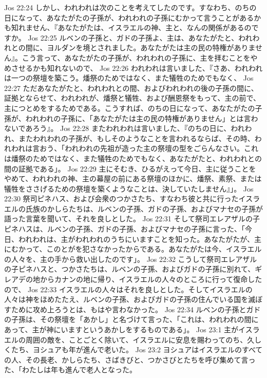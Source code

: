 Jos 22:24  しかし、われわれは次のことを考えてしたのです。すなわち、のちの日になって、あなたがたの子孫が、われわれの子孫にむかって言うことがあるかも知れません、『あなたがたは、イスラエルの神、主と、なんの関係があるのですか。
Jos 22:25  ルベンの子孫と、ガドの子孫よ、主は、あなたがたと、われわれとの間に、ヨルダンを境とされました。あなたがたは主の民の特権がありません』。こう言って、あなたがたの子孫が、われわれの子孫に、主を拝むことをやめさせるかも知れないので、
Jos 22:26  われわれは言いました、『さあ、われわれは一つの祭壇を築こう。燔祭のためではなく、また犠牲のためでもなく、
Jos 22:27  ただあなたがたと、われわれとの間、およびわれわれの後の子孫の間に、証拠とならせて、われわれが、燔祭と犠牲、および酬恩祭をもって、主の前で、主につとめをするためである。こうすれば、のちの日になって、あなたがたの子孫が、われわれの子孫に、「あなたがたは主の民の特権がありません」とは言わないであろう』。
Jos 22:28  またわれわれは言いました、『のちの日に、われわれ、またわれわれの子孫が、もしそのようなことを言われるならば、その時、われわれは言おう、「われわれの先祖が造った主の祭壇の型をごらんなさい。これは燔祭のためではなく、また犠牲のためでもなく、あなたがたと、われわれとの間の証拠である」。
Jos 22:29  主にそむき、ひるがえって今日、主に従うことをやめて、われわれの神、主の幕屋の前にある祭壇のほかに、燔祭、素祭、または犠牲をささげるための祭壇を築くようなことは、決していたしません』」。
Jos 22:30  祭司ピネハス、および会衆のつかさたち、すなわち彼と共に行ったイスラエルの氏族のかしらたちは、ルベンの子孫、ガドの子孫、およびマナセの子孫が語った言葉を聞いて、それを良しとした。
Jos 22:31  そして祭司エレアザルの子ピネハスは、ルベンの子孫、ガドの子孫、およびマナセの子孫に言った、「今日、われわれは、主がわれわれのうちにいますことを知った。あなたがたが、主にむかって、このとがを犯さなかったからである。あなたがたは今、イスラエルの人々を、主の手から救い出したのです」。
Jos 22:32  こうして祭司エレアザルの子ピネハスと、つかさたちは、ルベンの子孫、およびガドの子孫に別れて、ギレアデの地からカナンの地に帰り、イスラエルの人々のところに行って復命したので、
Jos 22:33  イスラエルの人々はそれを良しとした。そしてイスラエルの人々は神をほめたたえ、ルベンの子孫、およびガドの子孫の住んでいる国を滅ぼすために攻め上ろうとは、もはや言わなかった。
Jos 22:34  ルベンの子孫とガドの子孫は、その祭壇を「あかし」と名づけて言った、「これは、われわれの間にあって、主が神にいますというあかしをするものである」。
Jos 23:1  主がイスラエルの周囲の敵を、ことごとく除いて、イスラエルに安息を賜わってのち、久しくたち、ヨシュアも年が進んで老いた。
Jos 23:2  ヨシュアはイスラエルのすべての人、その長老、かしらたち、さばきびと、つかさびとたちを呼び集めて言った、「わたしは年も進んで老人となった。
